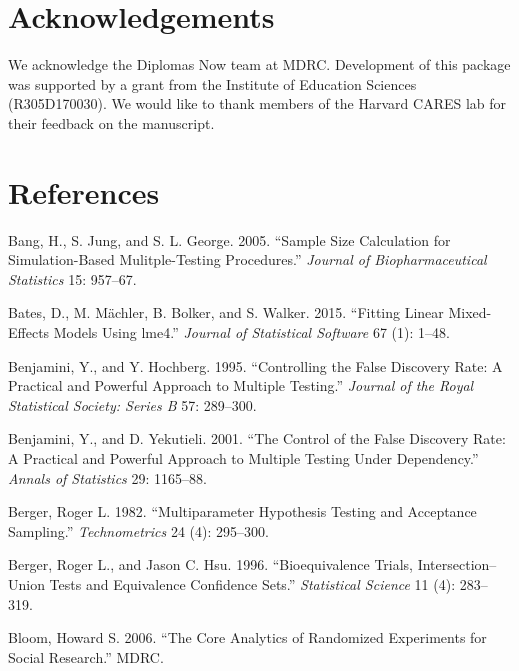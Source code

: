 \documentclass[
]{article}
\newlength{\cslhangindent}
\newlength{\cslentryspacingunit} %
\newenvironment{CSLReferences}[2] %
 {%
  \setlength{\parindent}{0pt}
  \ifodd #1
  \let\oldpar\par
  \def\par{\hangindent=\cslhangindent\oldpar}
  \fi
  \setlength{\parskip}{#2\cslentryspacingunit}
 }%
 {}
\begin{document}
\section*{Acknowledgements}

We acknowledge the Diplomas Now team at MDRC. Development of this
package was supported by a grant from the Institute of Education
Sciences (R305D170030). We would like to thank members of the Harvard
CARES lab for their feedback on the manuscript.

\section{References}

\hypertarget{refs}{}
\begin{CSLReferences}{1}{0}
\leavevmode{}%
Bang, H., S. Jung, and S. L. George. 2005. {``Sample Size Calculation
for Simulation-Based Mulitple-Testing Procedures.''} \emph{Journal of
Biopharmaceutical Statistics} 15: 957--67.

\leavevmode{}%
Bates, D., M. Mächler, B. Bolker, and S. Walker. 2015. {``Fitting Linear
Mixed-Effects Models Using {lme4}.''} \emph{Journal of Statistical
Software} 67 (1): 1--48.

\leavevmode{}%
Benjamini, Y., and Y. Hochberg. 1995. {``Controlling the False Discovery
Rate: A Practical and Powerful Approach to Multiple Testing.''}
\emph{Journal of the Royal Statistical Society: Series B} 57: 289--300.

\leavevmode{}%
Benjamini, Y., and D. Yekutieli. 2001. {``The Control of the False
Discovery Rate: A Practical and Powerful Approach to Multiple Testing
Under Dependency.''} \emph{Annals of Statistics} 29: 1165--88.

\leavevmode{}%
Berger, Roger L. 1982. {``Multiparameter Hypothesis Testing and
Acceptance Sampling.''} \emph{Technometrics} 24 (4): 295--300.

\leavevmode{}%
Berger, Roger L., and Jason C. Hsu. 1996. {``Bioequivalence Trials,
Intersection--Union Tests and Equivalence Confidence Sets.''}
\emph{Statistical Science} 11 (4): 283--319.

\leavevmode{}%
Bloom, Howard S. 2006. {``The Core Analytics of Randomized Experiments
for Social Research.''} MDRC.


\end{CSLReferences}
\end{document}

